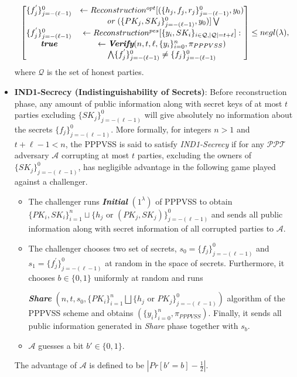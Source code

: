 \begin{itemize}
\begin{align*}
\begin{bmatrix}
        \{f_j^{'}\}_{j=-(\ell-1)}^0&\leftarrow Reconstruction^{opt}[(\{h_j,f_j,r_j\}_{j=-(\ell-1)}^0,y_0)\\
        &\textit{ or }(\{PK_j,SK_j\}_{j=-(\ell-1)}^0,y_0)]\bigvee\\
        \{f_j^{'}\}_{j=-(\ell-1)}^0&\leftarrow Reconstruction^{pes}[\{y_i,SK_i\}_{i\in\mathcal{Q},|\mathcal{Q}|=t+\ell}]:\\
        \textit{\textbf{true}}&\leftarrow \textit{\textbf{Verify}} (n,t,\ell,\{y_i\}_{i=0}^n,\pi_{PPPVSS})\\
        &\bigwedge \{f_j^{'}\}_{j=-(\ell-1)}^0\neq \{f_j\}_{j=-(\ell-1)}^0
      \end{bmatrix} \leq negl(\lambda),
    \end{align*}
    where $\mathcal{Q}$ is the set of honest parties.
  \item \textbf{IND1-Secrecy (Indistinguishability of Secrets)}: Before reconstruction phase, any amount of public 
    information along with secret keys of at most $t$ parties excluding $\{SK_j\}_{j=-(\ell-1)}^0$ will give 
    absolutely no information about the secrets $\{f_j\}_{j=-(\ell-1)}^0$. More formally, for integers $n>1$ and 
    $t+\ell-1<n$, the PPPVSS is said to satisfy \textit{IND1-Secrecy} if for any $\mathcal{PPT}$ adversary $\mathcal{A}$ 
    corrupting at most $t$ parties, excluding the owners of $\{SK_j\}_{j=-(\ell-1)}^0$, has negligible 
    advantage in the following game \cite{cryptoeprint:2025/576} played against a challenger.
    \begin{itemize}
      \item The challenger runs \textit{\textbf{Initial}} $(1^\lambda)$ of PPPVSS to obtain 
        $\{PK_i,SK_i\}_{i=1}^n\sqcup\{h_j\text{ or }(PK_j,SK_j)\}_{j=-(\ell-1)}^0$ and sends all public 
        information along with secret information of all corrupted parties to $\mathcal{A}$.
      \item The challenger chooses two set of secrets, $s_0=\{f_j\}_{j=-(\ell-1)}^0$ and 
        $s_1=\{f_j^{'}\}_{j=-(\ell-1)}^0$ at random in the space of secrets. Furthermore, it chooses $b\in\{0,1\}$ 
        uniformly at random and runs \par 
        \textit{\textbf{Share}} $(n,t,s_0,\{PK_i\}_{i=1}^n\bigsqcup\{h_j\text{ or }PK_j\}_{j=-(\ell-1)}^0)$ 
        algorithm of the PPPVSS scheme and obtains $(\{y_i\}_{i=0}^n,\pi_{PPPVSS})$. Finally, it sends 
        all public information generated in \textit{Share} phase together with $s_b$.
      \item $\mathcal{A}$ guesses a bit $b'\in\{0,1\}$.
    \end{itemize}
    The advantage of $\mathcal{A}$ is defined to be $|Pr[b'=b]-\frac{1}{2}|$.
\end{itemize}

